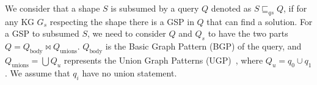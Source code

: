 We consider that a shape $S$ is subsumed by a query $Q$ denoted as $S \sqsubseteq_{qs} Q$, 
if for any KG $G_s$ respecting the shape there is a GSP in $Q$ that can find a solution.
For a GSP to subsumed $S$, we need to consider $Q$ and $Q_s$ to have the two parts $Q = Q_{\text{body}} \bowtie Q_{\text{unions}}$.
$Q_{\text{body}}$ is the Basic Graph Pattern (BGP) of the query, and $Q_{\text{unions}} = \bigcup Q_u$ represents the Union Graph Patterns (UGP)~\cite{w3SPARQLQuery}, where $Q_u = q_0 \cup q_1$.
We assume that $q_i$ have no union statement.

